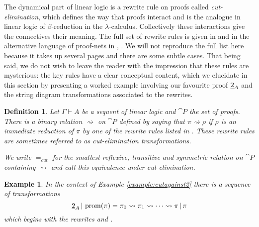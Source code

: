 \documentclass[english,letter paper,12pt,reqno]{article}
\theoremstyle{example}
\newtheorem{definition}[theorem]{Definition}
\newtheorem{example}[theorem]{Example}
\begin{document}
The dynamical part of linear logic is a rewrite rule on proofs called \emph{cut-elimination}, which defines the way that proofs interact and is the analogue in linear logic of $\beta$-reduction in the $\lambda$-calculus. Collectively these interactions give the connectives their meaning. The full set of rewrite rules is given in \cite[Section 3]{mellies} and in the alternative language of proof-nets in \cite[\S 4]{girard_llogic}, \cite[p.18]{pagani}. We will not reproduce the full list here because it takes up several pages and there are some subtle cases. That being said, we do not wish to leave the reader with the impression that these rules are mysterious: the key rules have a clear conceptual content, which we elucidate in this section by presenting a worked example involving our favourite proof $\underline{2}_A$ and the string diagram transformations associated to the rewrites.

\begin{definition} Let $\Gamma \vdash A$ be a sequent of linear logic and $\cat{P}$ the set of proofs. There is a binary relation $\rightsquigarrow$ on $\cat{P}$ defined by saying that $\pi \rightsquigarrow \rho$ if $\rho$ is an immediate reduction of $\pi$ by one of the rewrite rules listed in \cite[Section 3]{mellies}. These rewrite rules are sometimes referred to as \emph{cut-elimination transformations}.

We write $=_{cut}$ for the smallest reflexive, transitive and symmetric relation on $\cat{P}$ containing $\rightsquigarrow$ and call this \emph{equivalence under cut-elimination}.
\end{definition}


\begin{example}
In the context of Example \ref{example:cutagainst2} there is a sequence of transformations
\[
\underline{2}_A \,|\, \operatorname{prom}( \pi ) = \pi_0 \rightsquigarrow \pi_1 \rightsquigarrow \cdots \rightsquigarrow \pi \,|\, \pi
\]
which begins with the rewrites \cite[\S 3.9.3]{mellies} and \cite[\S 3.9.1]{mellies}.
\end{example}
\end{document}
